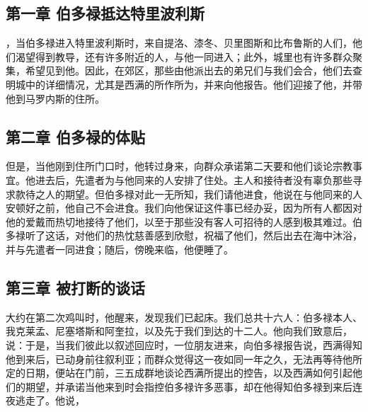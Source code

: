 \subsection{第一章 伯多禄抵达特里波利斯}

，当伯多禄进入特里波利斯时，来自提洛、漆冬、贝里图斯和比布鲁斯的人们，他们渴望得到教导，还有许多附近的人，与他一同进入；此外，城里也有许多群众聚集，希望见到他。因此，在郊区，那些由他派出去的弟兄们与我们会合，他们去查明城中的详细情况，尤其是西满的所作所为，并来向他报告。他们迎接了他，并带他到马罗内斯的住所。\par


\subsection{第二章 伯多禄的体贴}

但是，当他刚到住所门口时，他转过身来，向群众承诺第二天要和他们谈论宗教事宜。他进去后，先遣者为与他同来的人安排了住处。主人和接待者没有辜负那些寻求款待之人的期望。但伯多禄对此一无所知，我们请他进食，他说在与他同来的人安顿好之前，他自己不会进食。我们向他保证这件事已经办妥，因为所有人都因对他的爱戴而热切地接待了他们，以至于那些没有客人可招待的人感到极其难过。伯多禄听了这话，对他们的热忱慈善感到欣慰，祝福了他们，然后出去在海中沐浴，并与先遣者一同进食；随后，傍晚来临，他便睡了。\par


\subsection{第三章 被打断的谈话}

大约在第二次鸡叫时，他醒来，发现我们已起床。我们总共十六人：伯多禄本人、我克莱孟、尼塞塔斯和阿奎拉，以及先于我们到达的十二人。他向我们致意后，说：于是，当我们彼此以叙述回应时，一位朋友进来，向伯多禄报告说，西满得知他到来后，已动身前往叙利亚；而群众觉得这一夜如同一年之久，无法再等待他所定的日期，便站在门前，三五成群地谈论西满所提出的控告，以及西满如何引起他们的期望，并承诺当他来到时会指控伯多禄许多恶事，却在他得知伯多禄到来后连夜逃走了。他说，\par

